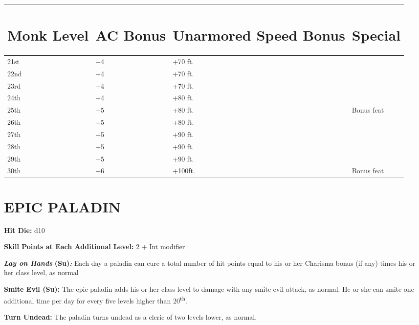\documentclass{article}
\begin{document}
\begin{tabular}{|>{\raggedright}p{29pt}|>{\raggedright}p{32pt}|>{\raggedright}p{78pt}|>{\raggedright}p{60pt}|}
\hline
\section*{M\textbf{onk Level}} & \section*{A\textbf{C Bonus}} & \section*{U\textbf{narmored 
Speed Bonus}} & \section*{S\textbf{pecial }}\tabularnewline
\hline
21st & +4 & +70 ft. & \tabularnewline
\hline
22nd & +4 & +70 ft. & \tabularnewline
\hline
23rd & +4 & +70 ft. & \tabularnewline
\hline
24th & +4 & +80 ft. & \tabularnewline
\hline
25th & +5 & +80 ft. & Bonus feat \tabularnewline
\hline
26th & +5 & +80 ft. & \tabularnewline
\hline
27th & +5 & +90 ft. & \tabularnewline
\hline
28th & +5 & +90 ft. & \tabularnewline
\hline
29th & +5 & +90 ft. & \tabularnewline
\hline
30th & +6 & +100ft. & Bonus feat \tabularnewline
\hline
\end{tabular}

\vspace{24pt}
\section*{{\LARGE{}EPIC PALADIN }}

\textbf{Hit Die:} d10

\textbf{Skill Points at Each Additional Level:} 2 + Int modifier

\textit{\textbf{Lay on Hands}}\textbf{ (Su)}\textit{\textbf{:}}\textit{ }Each day 
a paladin can cure a total number of hit points equal to his or her Charisma bonus 
(if any) times his or her class level, as normal

\textbf{Smite Evil (Su):} The epic paladin adds his or her class level to damage 
with any smite evil attack, as normal. He or she can smite one additional time 
per day for every five levels higher than 20\textsuperscript{th}.

\textbf{Turn Undead: }The paladin turns undead as a cleric of two levels lower, 
as normal. 
\end{document}
